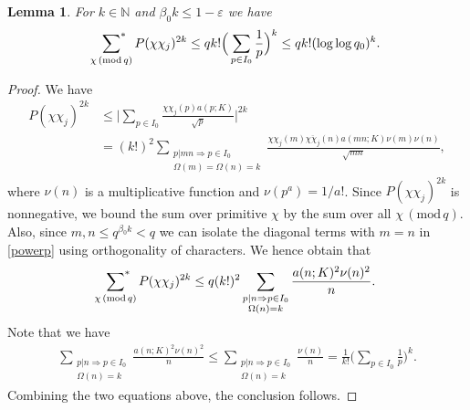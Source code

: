 \documentclass[12pt, reqno]{amsart}
\renewcommand{\pmod}[1]{\,(\mathrm{mod}\,#1)}
\newcommand{\acom}[1]{{\color{blue}{Alexandra: #1}} }
\newcommand{\hcom}[1]{{\color{red}{Hung: #1}} }
\newtheorem{lemma}[theorem]{Lemma}
\numberwithin{equation}{section}
\numberwithin{theorem}{section}
\numberwithin{equation}{section}
\def\sumstar{\sideset{}{^*}\sum}
\begin{document}
\begin{lemma} \label{momentsP}
For $k\in\mathbb{N}$ and $\beta_0k \le 1-\varepsilon$ %
we have
\begin{equation*}
\sumstar_{\substack{\chi \pmod q}}  P(\chi\chi_j)^{2k} \le qk! \Big(\sum_{p\in I_0} \frac{1}{p} \Big)^k\leq qk!(\log\log q_0)^k.
\end{equation*}
\end{lemma}
\begin{proof}
We have
\begin{align}
    \label{powerp}
    P(\chi \chi_j)^{2k} &\leq \bigg|\sum_{p \in I_0} \frac{\chi\chi_j(p) a(p;K)}{\sqrt{p}}\bigg|^{2k}\nonumber\\
    &= (k!)^2\sum_{\substack{p |mn \Rightarrow p \in I_0 \\ \Omega(m)=\Omega(n)=k}} \frac{ \chi\chi_j(m) \overline{\chi \chi_j}(n) a(mn;K) \nu(m)\nu(n)}{\sqrt{mn}},
    \end{align}
    where $\nu(n)$ is a multiplicative function and $\nu(p^a)=1/a!$.
   Since $P(\chi \chi_j)^{2k}$ is nonnegative, we bound the sum over primitive $\chi$ by the sum over all $\chi \pmod q$. Also, since $m,n \leq q^{\beta_0k} <q$ we can isolate the diagonal terms with $m=n$ in \eqref{powerp} using orthogonality of characters.
 We hence obtain that 
    \begin{align*}
      \sumstar_{\substack{\chi \pmod q}}  P(\chi\chi_j)^{2k}   \leq  q (k!)^2  \sum_{\substack{p|n \Rightarrow p \in I_0 \\ \Omega(n) =k}} \frac{ a(n;K)^2 \nu(n)^2}{n}.
    \end{align*}
    Note that we have 
    \begin{align*}
        \sum_{\substack{p|n \Rightarrow p \in I_0 \\ \Omega(n) =k}} \frac{ a(n;K)^2 \nu(n)^2}{n} \leq \sum_{\substack{p|n \Rightarrow p \in I_0 \\ \Omega(n) =k}} \frac{\nu(n)}{n}=  \frac{1}{k!} \Big( \sum_{p \in I_0} \frac{1}{p} \Big)^k.
    \end{align*}
    Combining the two equations above, the conclusion follows.
\end{proof}
\end{document}
